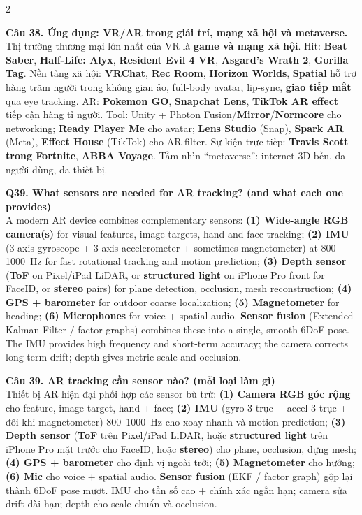\begin{paracol}{2}
\switchcolumn

\textbf{Câu 38. Ứng dụng: VR/AR trong giải trí, mạng xã hội và metaverse.}\\
Thị trường thương mại lớn nhất của VR là \textbf{game và mạng xã hội}. Hit: \textbf{Beat Saber}, \textbf{Half-Life: Alyx}, \textbf{Resident Evil 4 VR}, \textbf{Asgard's Wrath 2}, \textbf{Gorilla Tag}. Nền tảng xã hội: \textbf{VRChat}, \textbf{Rec Room}, \textbf{Horizon Worlds}, \textbf{Spatial} hỗ trợ hàng trăm người trong không gian ảo, full-body avatar, lip-sync, \textbf{giao tiếp mắt} qua eye tracking. AR: \textbf{Pokemon GO}, \textbf{Snapchat Lens}, \textbf{TikTok AR effect} tiếp cận hàng tỉ người. Tool: Unity + Photon Fusion/\textbf{Mirror}/\textbf{Normcore} cho networking; \textbf{Ready Player Me} cho avatar; \textbf{Lens Studio} (Snap), \textbf{Spark AR} (Meta), \textbf{Effect House} (TikTok) cho AR filter. Sự kiện trực tiếp: \textbf{Travis Scott trong Fortnite}, \textbf{ABBA Voyage}. Tầm nhìn ``metaverse'': internet 3D bền, đa người dùng, đa thiết bị.

\switchcolumn*

\textbf{Q39. What sensors are needed for AR tracking? (and what each one provides)}\\
A modern AR device combines complementary sensors: \textbf{(1) Wide-angle RGB camera(s)} for visual features, image targets, hand and face tracking; \textbf{(2) IMU} (3-axis gyroscope + 3-axis accelerometer + sometimes magnetometer) at 800--1000~Hz for fast rotational tracking and motion prediction; \textbf{(3) Depth sensor} (\textbf{ToF} on Pixel/iPad LiDAR, or \textbf{structured light} on iPhone Pro front for FaceID, or \textbf{stereo} pairs) for plane detection, occlusion, mesh reconstruction; \textbf{(4) GPS + barometer} for outdoor coarse localization; \textbf{(5) Magnetometer} for heading; \textbf{(6) Microphones} for voice + spatial audio. \textbf{Sensor fusion} (Extended Kalman Filter / factor graphs) combines these into a single, smooth 6DoF pose. The IMU provides high frequency and short-term accuracy; the camera corrects long-term drift; depth gives metric scale and occlusion.

\switchcolumn

\textbf{Câu 39. AR tracking cần sensor nào? (mỗi loại làm gì)}\\
Thiết bị AR hiện đại phối hợp các sensor bù trừ: \textbf{(1) Camera RGB góc rộng} cho feature, image target, hand + face; \textbf{(2) IMU} (gyro 3 trục + accel 3 trục + đôi khi magnetometer) 800--1000~Hz cho xoay nhanh và motion prediction; \textbf{(3) Depth sensor} (\textbf{ToF} trên Pixel/iPad LiDAR, hoặc \textbf{structured light} trên iPhone Pro mặt trước cho FaceID, hoặc \textbf{stereo}) cho plane, occlusion, dựng mesh; \textbf{(4) GPS + barometer} cho định vị ngoài trời; \textbf{(5) Magnetometer} cho hướng; \textbf{(6) Mic} cho voice + spatial audio. \textbf{Sensor fusion} (EKF / factor graph) gộp lại thành 6DoF pose mượt. IMU cho tần số cao + chính xác ngắn hạn; camera sửa drift dài hạn; depth cho scale chuẩn và occlusion.


\end{paracol}

